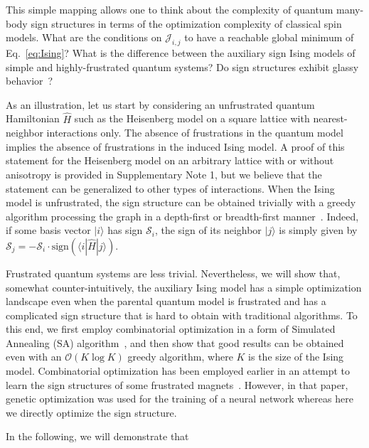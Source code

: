 This simple mapping allows one to think about the complexity of quantum many-body sign structures in terms of the optimization complexity of classical spin models. What are the conditions on $\mathcal{J}_{i,j}$ to have a reachable global minimum of Eq.~\eqref{eq:Ising}? What is the difference between the auxiliary sign Ising models of simple and highly-frustrated quantum systems? Do sign structures exhibit glassy behavior~\cite{glasses}?

As an illustration, let us start by considering an unfrustrated quantum Hamiltonian $\hat{H}$ such as the Heisenberg model on a square lattice with nearest-neighbor interactions only. The absence of frustrations in the quantum model implies the absence of frustrations in the induced Ising model. A proof of this statement for the Heisenberg model on an arbitrary lattice with or without anisotropy is provided in Supplementary Note 1, but we believe that the statement can be generalized to other types of interactions. When the Ising model is unfrustrated, the sign structure can be obtained trivially with a greedy algorithm processing the graph in a depth-first or breadth-first manner~\cite{CLRS}. Indeed, if some basis vector $|i\rangle$ has sign $\mathcal{S}_i$, the sign of its neighbor $|j\rangle$ is simply given by $\mathcal{S}_j = - \mathcal{S}_i \cdot \mbox{sign}(\langle i | \hat{H} |j\rangle)$.

Frustrated quantum systems are less trivial. Nevertheless, we will show that, somewhat counter-intuitively, the auxiliary Ising model has a simple optimization landscape even when the parental quantum model is frustrated and has a complicated sign structure that is hard to obtain with traditional algorithms. To this end, we first employ combinatorial optimization in a form of Simulated Annealing (SA) algorithm~\cite{SA}, and then show that good results can be obtained even with an $\mathcal{O}(K \log K)$ greedy algorithm, where $K$ is the size of the Ising model. Combinatorial optimization has been employed earlier in an attempt to learn the sign structures of some frustrated magnets~\cite{Nikita_sign}. However, in that paper, genetic optimization was used for the training of a neural network whereas here we directly optimize the sign structure.

In the following, we will demonstrate that


